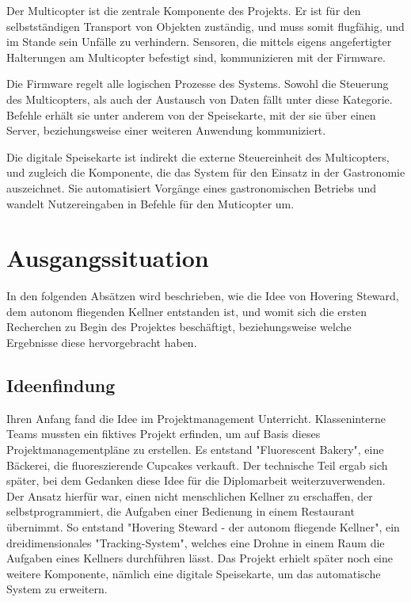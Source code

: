 Der Multicopter ist die zentrale Komponente des Projekts. Er ist für den selbstständigen Transport von Objekten zuständig,
und muss somit flugfähig, und im Stande sein Unfälle zu verhindern. Sensoren, die mittels eigens angefertigter Halterungen
am Multicopter befestigt sind, kommunizieren mit der Firmware.

Die Firmware regelt alle logischen Prozesse des Systems. Sowohl die Steuerung des Multicopters, als auch der
Austausch von Daten fällt unter diese Kategorie. Befehle erhält sie unter anderem von der Speisekarte, mit der sie über
einen Server, beziehungsweise einer weiteren Anwendung kommuniziert.

Die digitale Speisekarte ist indirekt die externe Steuereinheit des Multicopters, und zugleich die Komponente,
die das System für den Einsatz in der Gastronomie auszeichnet. Sie automatisiert Vorgänge eines gastronomischen
Betriebs und wandelt Nutzereingaben in Befehle für den Muticopter um.

\section{Ausgangssituation}
  In den folgenden Absätzen wird beschrieben, wie die Idee von Hovering Steward, dem autonom fliegenden Kellner
  entstanden ist, und womit sich die ersten Recherchen zu Begin des Projektes beschäftigt, beziehungsweise
  welche Ergebnisse diese hervorgebracht haben.

  \subsection{Ideenfindung}
  Ihren Anfang fand die Idee im Projektmanagement Unterricht. Klasseninterne Teams mussten ein fiktives Projekt erfinden, um auf Basis dieses
  Projektmanagementpläne zu erstellen. Es entstand "Fluorescent Bakery", eine Bäckerei, die fluoreszierende Cupcakes verkauft.
  Der technische Teil ergab sich später, bei dem Gedanken diese Idee für die Diplomarbeit weiterzuverwenden. Der Ansatz hierfür war,
  einen nicht menschlichen Kellner zu erschaffen, der selbstprogrammiert, die Aufgaben einer Bedienung in einem Restaurant übernimmt.
  So entstand "Hovering Steward - der autonom fliegende Kellner", ein dreidimensionales "Tracking-System", welches eine Drohne in einem Raum die Aufgaben eines Kellners durchführen lässt.
  Das Projekt erhielt später noch eine weitere Komponente, nämlich eine digitale Speisekarte, um das automatische System zu erweitern.

